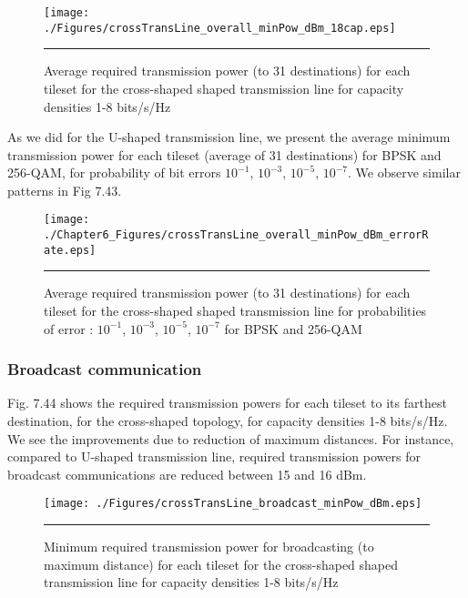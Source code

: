 \begin{figure}[H]
  \centering
    \texttt{[image: ./Figures/crossTransLine\_overall\_minPow\_dBm\_18cap.eps]}
    \rule{35em}{0.5pt}
  \caption[Average required transmission power (to 31 destinations) for each tileset for the cross-shaped shaped transmission line for capacity densities 1-8 bits/s/Hz]{Average required transmission power (to 31 destinations) for each tileset for the cross-shaped shaped transmission line for capacity densities 1-8 bits/s/Hz}
  \label{fig:Electron}
\end{figure}


As we did for the U-shaped transmission line, we present the average minimum transmission power for each tileset (average of 31 destinations) for BPSK and 256-QAM, for probability of bit errors $10^{-1}$, $10^{-3}$, $10^{-5}$, $10^{-7}$. We observe similar patterns in Fig 7.43.
    
\begin{figure}[H]
  \centering
    \texttt{[image: ./Chapter6\_Figures/crossTransLine\_overall\_minPow\_dBm\_errorRate.eps]}
    \rule{35em}{0.5pt}
  \caption[Average required transmission power (to 31 destinations) for each tileset for the cross-shaped shaped transmission line for probabilities of error : $10^{-1}$, $10^{-3}$, $10^{-5}$, $10^{-7}$ for BPSK and 256-QAM]{Average required transmission power (to 31 destinations) for each tileset for the cross-shaped shaped transmission line for probabilities of error : $10^{-1}$, $10^{-3}$, $10^{-5}$, $10^{-7}$ for BPSK and 256-QAM}
  \label{fig:Electron}
\end{figure}



\subsubsection{Broadcast communication}

Fig. 7.44 shows the required transmission powers for each tileset to its farthest destination, for the cross-shaped topology, for capacity densities 1-8 bits/s/Hz. We see the improvements due to reduction of maximum distances. For instance, compared to U-shaped transmission line, required transmission powers for broadcast communications are reduced between 15 and 16 dBm.  

\begin{figure}[htbp]
  \centering
    \texttt{[image: ./Figures/crossTransLine\_broadcast\_minPow\_dBm.eps]}
    \rule{35em}{0.5pt}
  \caption[Minimum required transmission power for broadcasting (to maximum distance) for each tileset for the cross-shaped shaped transmission line for capacity densities 1-8 bits/s/Hz]{Minimum required transmission power for broadcasting (to maximum distance) for each tileset for the cross-shaped shaped transmission line for capacity densities 1-8 bits/s/Hz}
  \label{fig:Electron}
\end{figure}


